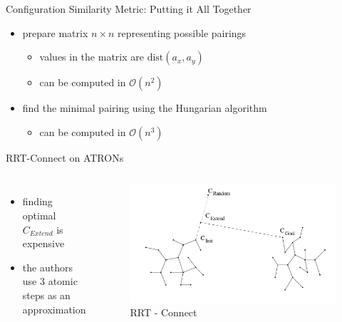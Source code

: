 \documentclass[ignorenonframetext,aspectratio=169,]{paradise-slide}
\providecommand{\tightlist}{%
  \setlength{\itemsep}{0pt}\setlength{\parskip}{0pt}}
\begin{document}
\begin{frame}[fragile]{Configuration Similarity Metric: Putting it All Together}
\protect\hypertarget{configuration-similarity-metric-putting-it-all-together}{}

\begin{itemize}
\tightlist
\item
  prepare matrix \(n\times n\) representing possible pairings

  \begin{itemize}
  \tightlist
  \item
    values in the matrix are \(\text{dist}(a_x, a_y)\)
  \item
    can be computed in \(\mathcal{O}(n^2)\)
  \end{itemize}
\item
  find the minimal pairing using the Hungarian algorithm

  \begin{itemize}
  \tightlist
  \item
    can be computed in \(\mathcal{O}(n^3)\)
  \end{itemize}
\end{itemize}

\end{frame}

\begin{frame}[fragile]{RRT-Connect on ATRONs}
\protect\hypertarget{rrt-connect-on-atrons}{}

\begin{columns}


\begin{itemize}
\tightlist
\item
  finding optimal \(C_{Extend}\) is expensive
\item
  the authors use 3 atomic steps as an approximation
\end{itemize}


\begin{figure}
\centering
\includegraphics{rrtconect.png}
\caption{RRT - Connect}
\end{figure}

\end{columns}

\end{frame}
\end{document}
